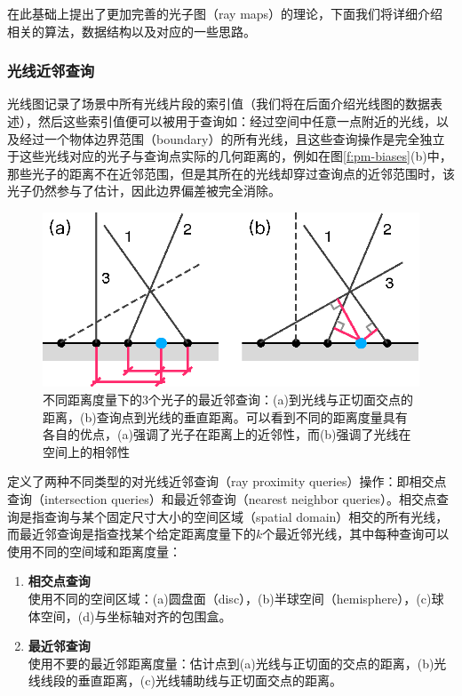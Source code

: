\cite{a:RayMapsforGlobalIllumination}在此基础上提出了更加完善的光子图（ray maps）的理论，下面我们将详细介绍相关的算法，数据结构以及对应的一些思路。




\subsubsection{光线近邻查询}
光线图记录了场景中所有光线片段的索引值（我们将在后面介绍光线图的数据表述），然后这些索引值便可以被用于查询如：经过空间中任意一点附近的光线，以及经过一个物体边界范围（boundary）的所有光线，且这些查询操作是完全独立于这些光线对应的光子与查询点实际的几何距离的，例如在图\ref{f:pm-biases}(b)中，那些光子的距离不在近邻范围，但是其所在的光线却穿过查询点的近邻范围时，该光子仍然参与了估计，因此边界偏差被完全消除。

\begin{figure}
\sidecaption
	\includegraphics[width=.65\textwidth]{figures/pm/ray-proximity-queries}
	\caption{不同距离度量下的3个光子的最近邻查询：(a)到光线与正切面交点的距离，(b)查询点到光线的垂直距离。可以看到不同的距离度量具有各自的优点，(a)强调了光子在距离上的近邻性，而(b)强调了光线在空间上的相邻性}
	\label{f:pm-ray-proximity-queries}
\end{figure}

\cite{a:RayMapsforGlobalIllumination}定义了两种不同类型的对光线近邻查询（ray proximity queries）操作：即相交点查询（intersection queries）和最近邻查询（nearest neighbor queries）。相交点查询是指查询与某个固定尺寸大小的空间区域（spatial domain）相交的所有光线，而最近邻查询是指查找某个给定距离度量下的$k$个最近邻光线，其中每种查询可以使用不同的空间域和距离度量：

\begin{enumerate}[label=\Roman*.]
	\item \textbf{相交点查询}\\
		使用不同的空间区域：(a)圆盘面（disc），(b)半球空间（hemisphere），(c)球体空间，(d)与坐标轴对齐的包围盒。
	\item \textbf{最近邻查询}\\
		使用不要的最近邻距离度量：估计点到(a)光线与正切面的交点的距离，(b)光线线段的垂直距离，(c)光线辅助线与正切面交点的距离。
\end{enumerate}

